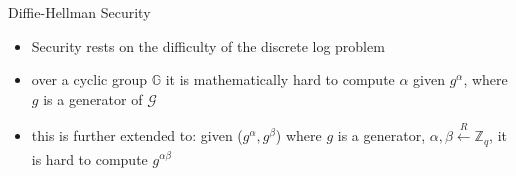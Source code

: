 \documentclass[handout]{beamer}
\begin{document}
\begin{frame}{Diffie-Hellman Security}
    \begin{itemize}
        \item \pause Security rests on the difficulty of the discrete log problem
        \item \pause over a cyclic group \(\mathbb{G}\) it is mathematically hard to compute \(\alpha\) given \(g^\alpha\), where \(g\) is a generator of \(\mathcal{G}\)
        \item \pause this is further extended to: given (\(g^\alpha, g^\beta\)) where \(g\) is a generator, \(\alpha, \beta \xleftarrow[]{R} \mathbb{Z}_q\), it is hard to compute \(g^{\alpha\beta}\)
    \end{itemize}
\end{frame}
\end{document}
